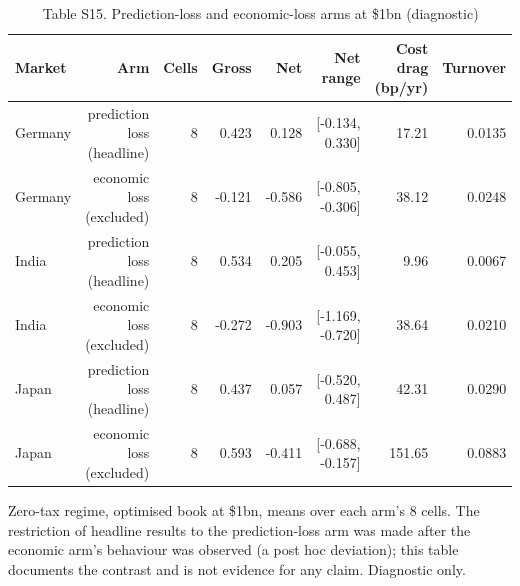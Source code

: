 \begin{table}[t]
\centering
\small
\caption{Table S15. Prediction-loss and economic-loss arms at \$1bn (diagnostic)}
\label{tab:s15}
\begin{tabular}{lrrrrrrr}
\toprule
Market & Arm & Cells & Gross & Net & Net range & Cost drag (bp/yr) & Turnover \\
\midrule
Germany & prediction loss (headline) & 8 & 0.423 & 0.128 & [-0.134, 0.330] & 17.21 & 0.0135 \\
Germany & economic loss (excluded) & 8 & -0.121 & -0.586 & [-0.805, -0.306] & 38.12 & 0.0248 \\
India & prediction loss (headline) & 8 & 0.534 & 0.205 & [-0.055, 0.453] & 9.96 & 0.0067 \\
India & economic loss (excluded) & 8 & -0.272 & -0.903 & [-1.169, -0.720] & 38.64 & 0.0210 \\
Japan & prediction loss (headline) & 8 & 0.437 & 0.057 & [-0.520, 0.487] & 42.31 & 0.0290 \\
Japan & economic loss (excluded) & 8 & 0.593 & -0.411 & [-0.688, -0.157] & 151.65 & 0.0883 \\
\bottomrule
\end{tabular}
\par\vspace{2pt}
\parbox{\textwidth}{\footnotesize Zero-tax regime, optimised book at \$1bn, means over each arm's 8 cells. The restriction of headline results to the prediction-loss arm was made after the economic arm's behaviour was observed (a post hoc deviation); this table documents the contrast and is not evidence for any claim. Diagnostic only.}
\end{table}
